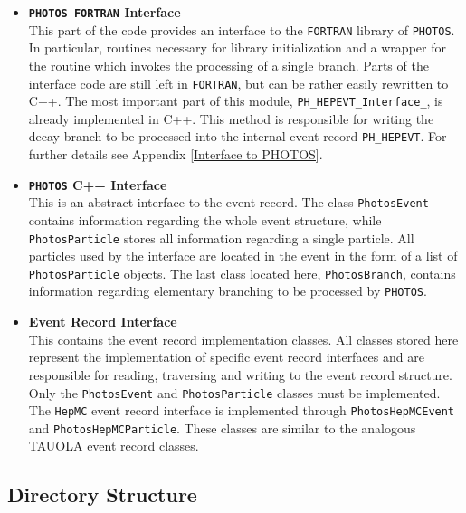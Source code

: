 \documentclass[]{Photos_interface_design}
\begin{document}
\begin{itemize}
  \item {\bf {\tt PHOTOS FORTRAN} Interface}\\
       This part of the code provides an interface 
       to the {\tt FORTRAN} library of {\tt PHOTOS}. In particular,  routines
       necessary for library initialization and a wrapper for the routine which invokes the processing
	   of a single branch. Parts of the interface code are still left in {\tt FORTRAN}, but
	   can be rather easily rewritten to C++. 
       The most important part of this module, {\tt PH\_HEPEVT\_Interface\_},
       is already implemented  in C++. This method is responsible for writing
	  the decay branch to be processed into the internal event record {\tt PH\_HEPEVT}.
       For further details see Appendix \ref{Interface to PHOTOS}.
  \item {\bf {\tt PHOTOS} C++ Interface} \\
       This is an abstract interface to the event record.
       The class {\tt PhotosEvent} contains information regarding the whole event
       structure, while {\tt PhotosParticle} stores all information regarding a single particle.
       All particles used by the interface are located in the event in the form of
       a list of {\tt PhotosParticle} objects.
       The last class located here, {\tt PhotosBranch}, contains information regarding
	 elementary branching to be processed by {\tt PHOTOS}.
  \item {\bf Event Record Interface} \\
       This contains the event record implementation classes. All classes stored here represent
       the implementation of specific event record interfaces and are responsible for reading,
       traversing and writing to the event record structure.
       Only the {\tt PhotosEvent} and {\tt PhotosParticle} classes must be implemented.
       The {\tt HepMC} event record interface is implemented
       through {\tt PhotosHepMCEvent} and {\tt PhotosHepMCParticle}. These classes are similar to the
       analogous TAUOLA \cite{Davidson:2010rw} event record classes.
\end{itemize}

\subsection{Directory Structure}
\end{document}
